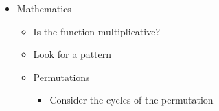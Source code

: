 \documentclass[11.5pt,a4paper,landscape,oneside]{amsart}
\newenvironment{myitemize}
{ \begin{itemize}[leftmargin=.5cm]
    \setlength{\itemsep}{0pt}
    \setlength{\parskip}{0pt}
    \setlength{\parsep}{0pt}     }
{ \end{itemize}                  }
\begin{document}
\begin{multicols*}{2}
\begin{myitemize}
\begin{itemize}
\begin{itemize}
                                \item Centers of the tree
                            \end{itemize}
                        \item Eulerian path/circuit
                        \item Chinese postman problem
                        \item Topological sort
                        \item (Min-Cost) Max Flow
                        \item Min Cut
                            \begin{itemize}
                                \item Maximum Density Subgraph
                            \end{itemize}
                        \item Huffman Coding
                        \item Min-Cost Arborescence
                        \item Steiner Tree
                        \item Kirchoff's matrix tree theorem
                        \item Pr\"ufer sequences
                        \item Lov\'asz Toggle
                        \item Look at the DFS tree (which has no cross-edges)
                        \item Is the graph a DFA or NFA?
                            \begin{itemize}
                                \item Is it the Synchronizing word problem?
                            \end{itemize}
                    \end{itemize}
                \item Mathematics
                    \begin{itemize}
                        \item Is the function multiplicative?
                        \item Look for a pattern
                        \item Permutations
                            \begin{itemize}
                                \item Consider the cycles of the permutation

\end{itemize}
\end{itemize}
\end{myitemize}
\end{multicols*}
\end{document}
